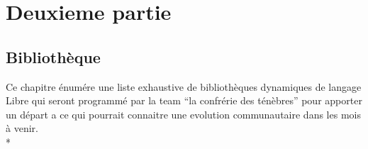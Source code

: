 \documentclass{report}
\begin{document}

\chapter{Deuxieme partie}

\section{Bibliothèque}

Ce chapitre énumére une liste exhaustive de bibliothèques dynamiques de langage Libre qui seront programmé par la team \enquote{la confrérie des ténèbres} pour apporter un départ a ce qui pourrait connaitre une evolution communautaire dans les mois à venir.\\*
\end{document}

